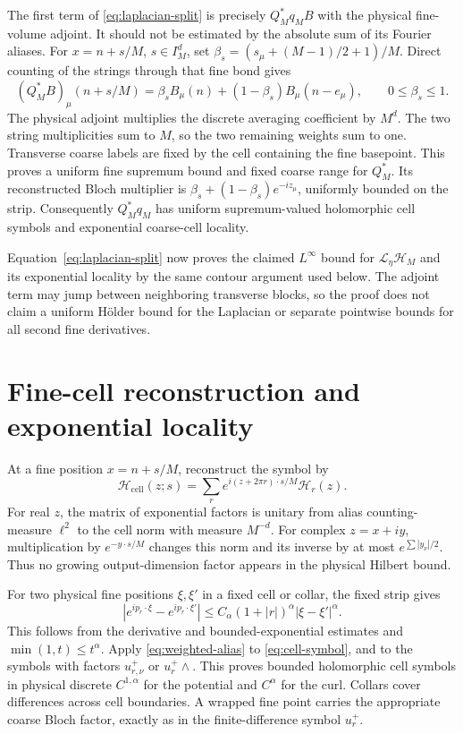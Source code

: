\documentclass[11pt]{article}
\theoremstyle{remark}
\newcommand{\HH}{\mathcal H}
\begin{document}
The first term of \eqref{eq:laplacian-split} is precisely
$Q_M^*q_MB$ with the physical fine-volume adjoint. It should not
be estimated by the absolute sum of its Fourier aliases.
For $x=n+s/M$, $s\in I_M^d$, set
$\beta_s=(s_\mu+(M-1)/2+1)/M$. Direct counting of the strings
through that fine bond gives
\begin{equation}\label{eq:adjoint-row}
 (Q_M^*B)_\mu(n+s/M)
 =\beta_s B_\mu(n)+(1-\beta_s)B_\mu(n-e_\mu),
 \qquad 0\le\beta_s\le1.
\end{equation}
The physical adjoint multiplies the discrete averaging coefficient
by $M^d$. The two string multiplicities sum to $M$, so the two
remaining weights sum to one. Transverse coarse labels are fixed
by the cell containing the fine basepoint. This proves a uniform
fine supremum bound and fixed coarse range for $Q_M^*$.
Its reconstructed Bloch multiplier is
$\beta_s+(1-\beta_s)e^{-iz_\mu}$, uniformly bounded on the strip.
Consequently $Q_M^*q_M$ has uniform supremum-valued holomorphic
cell symbols and exponential coarse-cell locality.

Equation~\eqref{eq:laplacian-split} now proves the claimed
$L^\infty$ bound for $\mathcal L_\eta\HH_M$ and its exponential
locality by the same contour argument used below. The adjoint term
may jump between neighboring transverse blocks, so the proof
does not claim a uniform H\"older bound for the Laplacian or
separate pointwise bounds for all second fine derivatives.

\section{Fine-cell reconstruction and exponential locality}

At a fine position $x=n+s/M$, reconstruct the symbol by
\begin{equation}\label{eq:cell-symbol}
 \HH_{\mathrm{cell}}(z;s)
       =\sum_r e^{i(z+2\pi r)\cdot s/M}\HH_r(z).
\end{equation}
For real $z$, the matrix of exponential factors is unitary from
alias counting-measure $\ell^2$ to the cell norm with measure
$M^{-d}$. For complex $z=x+iy$, multiplication by
$e^{-y\cdot s/M}$ changes this norm and its inverse by at most
$e^{\sum|y_\nu|/2}$. Thus no growing output-dimension factor
appears in the physical Hilbert bound.

For two physical fine positions $\xi,\xi'$ in a fixed cell or
collar, the fixed strip gives
\[
 |e^{ip_r\cdot\xi}-e^{ip_r\cdot\xi'}|
       \le C_\alpha(1+|r|)^\alpha|\xi-\xi'|^\alpha.
\]
This follows from the derivative and bounded-exponential estimates
and $\min(1,t)\le t^\alpha$. Apply
\eqref{eq:weighted-alias} to \eqref{eq:cell-symbol}, and to the
symbols with factors $u_{r,\nu}^+$ or $u_r^+\wedge$.
This proves bounded holomorphic cell symbols in physical discrete
$C^{1,\alpha}$ for the potential and $C^\alpha$ for the curl.
Collars cover differences across cell boundaries. A wrapped fine
point carries the appropriate coarse Bloch factor, exactly as in
the finite-difference symbol $u_r^+$.
\end{document}
